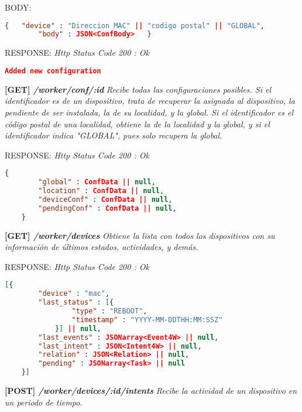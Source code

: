     BODY:
   \begin{lstlisting}[language=json,firstnumber=1]
    {   "device" : "Direccion MAC" || "codigo postal" || "GLOBAL",
        "body" : JSON<ConfBody>   }
    \end{lstlisting} 
    
    RESPONSE: \newline
    \textit{Http Status Code 200 : Ok}
    \begin{lstlisting}[language=json,firstnumber=1]
    Added new configuration
    \end{lstlisting}
\hline \newline

\textbf{[GET] \textit{/worker/conf/:id }}
\textit{Recibe todas las configuraciones posibles. Si el identificador es de un dispositivo, trata de recuperar la asignada al dispositivo, la pendiente de ser instalada, la de su localidad, y la global. Si el identificador es el código postal de una localidad, obtiene la de la localidad y la global, y si el identificador indica "GLOBAL", pues solo recupera la global.}
    
    RESPONSE: \newline
    \textit{Http Status Code 200 : Ok}
    \begin{lstlisting}[language=json,firstnumber=1]
    {
        "global" : ConfData || null,
        "location" : ConfData || null,
        "deviceConf" : ConfData || null,
        "pendingConf" : ConfData || null,
    }
    \end{lstlisting}

\newpage %
\textbf{[GET] \textit{/worker/devices }}
\textit{Obtiene la lista con todos los dispositivos con su información de últimos estados, actividades, y demás.}
    
    RESPONSE: \newline
    \textit{Http Status Code 200 : Ok}
    \begin{lstlisting}[language=json,firstnumber=1]
    [{
        "device" : "mac",
        "last_status" : [{
                "type" : "REBOOT",
                "timestamp" : "YYYY-MM-DDTHH:MM:SSZ"
            }] || null,
        "last_events" : JSONarray<Event4W> || null,
        "last_intent" : JSON<Intent4W> || null,
        "relation" : JSON<Relation> || null,
        "pending" : JSONarray<Task> || null
    }]
    \end{lstlisting}
\hline

\textbf{[POST] \textit{/worker/devices/:id/intents }}
\textit{Recibe la actividad de un dispositivo en un periodo de tiempo.}

